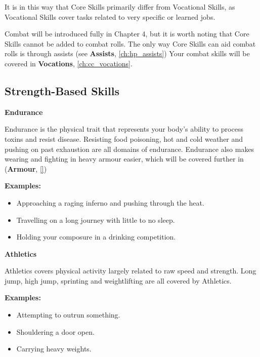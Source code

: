 It is in this way that Core Skills primarily differ from Vocational Skills, as Vocational Skills cover tasks related to very specific or learned jobs.

Combat will be introduced fully in Chapter 4, but it is worth noting that Core Skills cannot be added to combat rolls. The only way Core Skills can aid combat rolls is through assists (see \textbf{Assists}, \autoref{ch:hp_assists}) Your combat skills will be covered in \textbf{Vocations}, \autoref{ch:cc_vocations}.

\subsection{Strength-Based Skills} \label{subsec:strength_based_skills}

\textbf{Endurance}

Endurance is the physical trait that represents your body’s ability to process toxins and resist disease. Resisting food poisoning, hot and cold weather and pushing on past exhaustion are all domains of endurance. Endurance also makes wearing and fighting in heavy armour easier, which will be covered further in (\textbf{Armour}, \autoref{}) %

\begin{displayquote}
    \textbf{Examples:}
    \begin{itemize}
        \item Approaching a raging inferno and pushing through the heat.
        \item Travelling on a long journey with little to no sleep.
        \item Holding your composure in a drinking competition.
    \end{itemize}
\end{displayquote}

\textbf{Athletics}

Athletics covers physical activity largely related to raw speed and strength. Long jump, high jump, sprinting and weightlifting are all covered by Athletics.

\begin{displayquote}
    \textbf{Examples:}
    \begin{itemize}
        \item Attempting to outrun something.
        \item Shouldering a door open.
        \item Carrying heavy weights.
    \end{itemize}
\end{displayquote}


